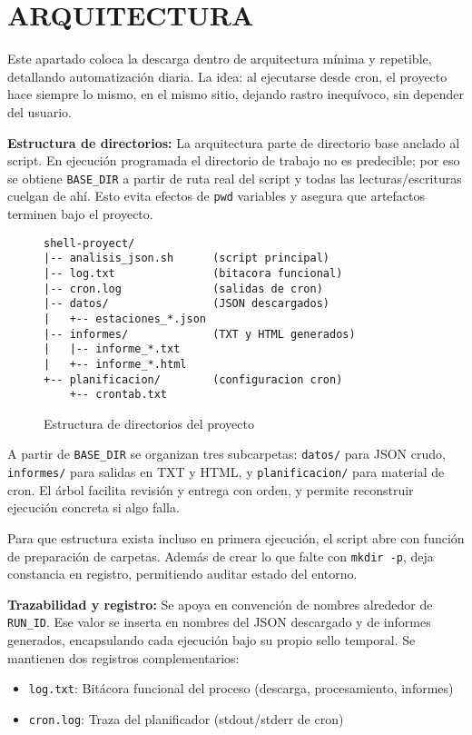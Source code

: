 \chapter{ARQUITECTURA}

Este apartado coloca la descarga dentro de arquitectura mínima y repetible, detallando automatización diaria. La idea: al ejecutarse desde cron, el proyecto hace siempre lo mismo, en el mismo sitio, dejando rastro inequívoco, sin depender del usuario.

\textbf{Estructura de directorios:} La arquitectura parte de directorio base anclado al script. En ejecución programada el directorio de trabajo no es predecible; por eso se obtiene \texttt{BASE\_DIR} a partir de ruta real del script y todas las lecturas/escrituras cuelgan de ahí. Esto evita efectos de \texttt{pwd} variables y asegura que artefactos terminen bajo el proyecto.

\begin{figure}[H]
  \centering
  \footnotesize
  \begin{verbatim}
shell-proyect/
|-- analisis_json.sh      (script principal)
|-- log.txt               (bitacora funcional)
|-- cron.log              (salidas de cron)
|-- datos/                (JSON descargados)
|   +-- estaciones_*.json
|-- informes/             (TXT y HTML generados)
|   |-- informe_*.txt
|   +-- informe_*.html
+-- planificacion/        (configuracion cron)
    +-- crontab.txt
\end{verbatim}
  \caption{Estructura de directorios del proyecto}
\end{figure}

A partir de \texttt{BASE\_DIR} se organizan tres subcarpetas: \texttt{datos/} para JSON crudo, \texttt{informes/} para salidas en TXT y HTML, y \texttt{planificacion/} para material de cron. El árbol facilita revisión y entrega con orden, y permite reconstruir ejecución concreta si algo falla.

Para que estructura exista incluso en primera ejecución, el script abre con función de preparación de carpetas. Además de crear lo que falte con \texttt{mkdir -p}, deja constancia en registro, permitiendo auditar estado del entorno.

\textbf{Trazabilidad y registro:} Se apoya en convención de nombres alrededor de \texttt{RUN\_ID}. Ese valor se inserta en nombres del JSON descargado y de informes generados, encapsulando cada ejecución bajo su propio sello temporal. Se mantienen dos registros complementarios:

\begin{itemize}[noitemsep]
  \item \texttt{log.txt}: Bitácora funcional del proceso (descarga, procesamiento, informes)
  \item \texttt{cron.log}: Traza del planificador (stdout/stderr de cron)
\end{itemize}

